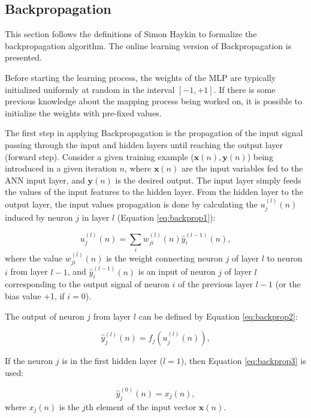 \subsection{Backpropagation}
\label{ssec:Pseudocodigo}

This section follows the definitions of Simon Haykin \cite{haykin} to formalize the backpropagation algorithm. The online learning version of Backpropagation is presented.

Before starting the learning process, the weights of the MLP are typically initialized uniformly at random in the interval $[-1,+1]$. If there is some previous knowledge about the mapping process being worked on, it is possible to initialize the weights with pre-fixed values.  

The first step in applying Backpropagation is the propagation of the input signal passing through the input and hidden layers until reaching the output layer (forward step). 
Consider a given training example ($\mathbf{x}(n), \mathbf{y}(n)$) being introduced in a given iteration $n$, where $\mathbf{x}(n)$ are the input variables fed to the ANN input layer, and $\mathbf{y}(n)$ is the desired output. The input layer simply feeds the values of the input features to the hidden layer. From the hidden layer to the output layer, the input values propagation is done by calculating the $u_j^{(l)}(n)$  induced by neuron $j$ in layer $l$ (Equation \ref{eq:backprop1}):


\begin{equation}
\label{eq:backprop1}
    u_j^{(l)}(n) = \sum_i w_{ji}^{(l)}(n) \hat{y}_i^{(l-1)}(n),
\end{equation}
where the value $w_{ji}^{(l)}(n)$ is the weight connecting neuron $j$ of layer $l$ to neuron $i$ from layer $l-1$, and
$\hat{y}_i^{(l-1)}(n)$ is an input of neuron $j$ of layer $l$ corresponding to the output signal of neuron $i$ of the previous layer $l-1$ (or the bias value +1, if $i=0$).

The output of neuron $j$ from layer $l$ can be defined by Equation \ref{eq:backprop2}:

\begin{equation}
\label{eq:backprop2}
    \hat{y}_j^{(l)}(n) = f_j (u_j^{(l)} (n) ),
\end{equation}

If the neuron $j$ is in the first hidden layer ($l = 1$), then Equation \ref{eq:backprop3} is used:

\begin{equation}
    \label{eq:backprop3}
    \hat{y}_j^{(0)}(n) = x_j (n),
\end{equation}
where $x_j(n)$ is the $j$th element of the input vector $\mathbf{x}(n)$. 

